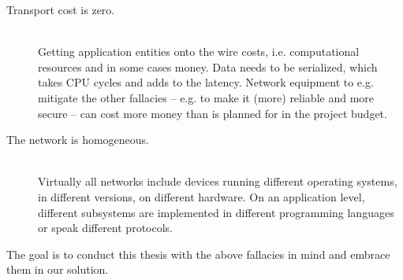\begin{description}
	\item [Transport cost is zero.] \hfill\\
		Getting application entities onto the wire costs, i.e.
		computational resources and in some cases money. Data needs to
		be serialized, which takes CPU cycles and adds to the latency.
		Network equipment to e.g. mitigate the other fallacies -- e.g.
		to make it (more) reliable and more secure -- can cost more
		money than is planned for in the project budget.

	\item [The network is homogeneous.] \hfill\\
		Virtually all networks include devices running different
		operating systems, in different versions, on different
		hardware. On an application level, different subsystems are
		implemented in different programming languages or speak
		different protocols.

\end{description}

The goal is to conduct this thesis with the above fallacies in mind and embrace
them in our solution.
